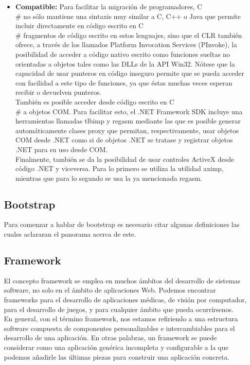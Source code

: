 \begin{itemize}
	\item \textbf{Compatible: } Para facilitar la migraci\'on de programadores, C\\# no s\'olo mantiene una sintaxis muy similar a C, C++ o Java que permite incluir directamente en c\'odigo escrito en C\\# fragmentos de c\'odigo escrito en estos lenguajes, sino que el CLR tambi\'en ofrece, a trav\'es de los llamados Platform Invocation Services (PInvoke), la posibilidad de acceder a c\'odigo nativo escrito como funciones sueltas no orientadas a objetos tales como las DLLs de la API Win32. N\'otese que la capacidad de usar punteros en c\'odigo inseguro permite que se pueda acceder con facilidad a este tipo de funciones, ya que \'estas muchas veces esperan recibir o devuelven punteros.\\

	Tambi\'en es posible acceder desde c\'odigo escrito en C\\# a objetos COM. Para facilitar esto, el .NET Framework SDK incluye una herramientas llamadas tlbimp y regasm mediante las que es posible generar autom\'aticamente clases proxy que permitan, respectivamente, usar objetos COM desde .NET como si de objetos .NET se tratase y registrar objetos .NET para su uso desde COM.\\

	Finalmente, tambi\'en se da la posibilidad de usar controles ActiveX desde c\'odigo .NET y viceversa. Para lo primero se utiliza la utilidad aximp, mientras que para lo segundo se usa la ya mencionada regasm.
\end{itemize}


\subsection{Bootstrap}

Para comenzar a hablar de bootstrap es necesario citar algunas definiciones las cuales aclararan el panorama acerca de este.

	\subsection{Framework}

	El concepto framework se emplea en muchos \'ambitos del desarrollo de sistemas software, no solo en el \'ambito de aplicaciones Web. Podemos encontrar frameworks para el desarrollo de aplicaciones m\'edicas, de visi\'on por computador, para el desarrollo de juegos, y para cualquier \'ambito que pueda ocurr\'irsenos.\\

 	En general, con el t\'ermino framework, nos estamos refiriendo a una estructura software compuesta de componentes personalizables e intercambiables para el desarrollo de una aplicaci\'on. En otras palabras, un framework se puede considerar como una aplicaci\'on gen\'erica incompleta y configurable a la que podemos a\~nadirle las \'ultimas piezas para construir una aplicaci\'on concreta.
